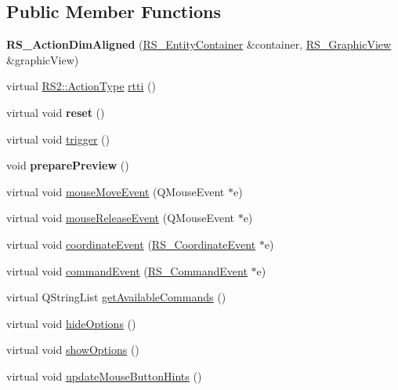 \subsection*{Public Member Functions}
\begin{DoxyCompactItemize}
\item 
\hypertarget{classRS__ActionDimAligned_a74d02fbbc5ec171304aab3353a9128a9}{{\bfseries R\-S\-\_\-\-Action\-Dim\-Aligned} (\hyperlink{classRS__EntityContainer}{R\-S\-\_\-\-Entity\-Container} \&container, \hyperlink{classRS__GraphicView}{R\-S\-\_\-\-Graphic\-View} \&graphic\-View)}\label{classRS__ActionDimAligned_a74d02fbbc5ec171304aab3353a9128a9}

\item 
virtual \hyperlink{classRS2_afe3523e0bc41fd637b892321cfc4b9d7}{R\-S2\-::\-Action\-Type} \hyperlink{classRS__ActionDimAligned_a310a67f6856ddf8680501966349ad338}{rtti} ()
\item 
\hypertarget{classRS__ActionDimAligned_ab86c7e025e3c22596aac75ac0f35d5eb}{virtual void {\bfseries reset} ()}\label{classRS__ActionDimAligned_ab86c7e025e3c22596aac75ac0f35d5eb}

\item 
virtual void \hyperlink{classRS__ActionDimAligned_ab0ba344ce5b27d4f98691da1aa8d1284}{trigger} ()
\item 
\hypertarget{classRS__ActionDimAligned_a5d911dc900b79e75c68bb5ca35b64523}{void {\bfseries prepare\-Preview} ()}\label{classRS__ActionDimAligned_a5d911dc900b79e75c68bb5ca35b64523}

\item 
virtual void \hyperlink{classRS__ActionDimAligned_ae74a2382172502b31267dce9acc59cc9}{mouse\-Move\-Event} (Q\-Mouse\-Event $\ast$e)
\item 
virtual void \hyperlink{classRS__ActionDimAligned_adfd65430283d7c45f76853524eeee158}{mouse\-Release\-Event} (Q\-Mouse\-Event $\ast$e)
\item 
virtual void \hyperlink{classRS__ActionDimAligned_a98af55ef9339b554688874b3d2ee0d03}{coordinate\-Event} (\hyperlink{classRS__CoordinateEvent}{R\-S\-\_\-\-Coordinate\-Event} $\ast$e)
\item 
virtual void \hyperlink{classRS__ActionDimAligned_a6370e20ca1766affe0aa4245a2bdaecf}{command\-Event} (\hyperlink{classRS__CommandEvent}{R\-S\-\_\-\-Command\-Event} $\ast$e)
\item 
virtual Q\-String\-List \hyperlink{classRS__ActionDimAligned_a808b0be39b43b00ccbeddd12871152c0}{get\-Available\-Commands} ()
\item 
virtual void \hyperlink{classRS__ActionDimAligned_a2f806401a7f3a61cf9127563f26635df}{hide\-Options} ()
\item 
virtual void \hyperlink{classRS__ActionDimAligned_adc53e3cabf298d21b273c88d2204fd74}{show\-Options} ()
\item 
virtual void \hyperlink{classRS__ActionDimAligned_a43ea7a89d21dd3e4fa6b4c37fbdc5802}{update\-Mouse\-Button\-Hints} ()
\end{DoxyCompactItemize}
